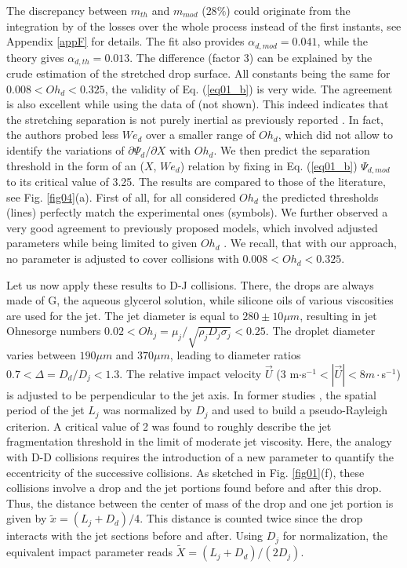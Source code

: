 \documentclass{article}
\begin{document}
 The discrepancy between $m_{th}$ and $m_{mod}$ ($28\%$) could originate from the integration by \cite{ref:Finotello2017} of the losses over the whole process instead of the first instants, see Appendix \ref{appF} for details.  {The fit also provides $\alpha_{d, mod}=0.041$, while the theory gives $\alpha_{d, th}=0.013$. The difference (factor 3) can be explained by the crude estimation of the stretched drop surface.} All constants being the same for $0.008 < Oh_d < 0.325$, the validity of Eq. (\ref{eq01_b}) is very wide. {The agreement is also excellent while using the data of \citet{al-dirawi_2021} (not shown).  This indeed indicates that  the stretching separation is not purely inertial as previously reported \cite{al-dirawi_2021}. In fact, the authors probed less $We_d$ over a smaller range of $Oh_d$, which did not allow to identify the variations of $  \partial \Psi_d/ \partial X$ with $Oh_d$}. We then predict the separation threshold in the form of an ($X$, $We_d$) relation by fixing in Eq. (\ref{eq01_b}) $\Psi_{d, mod}$ to its critical value of {3.25}. 
 The results are compared to those of the literature, see Fig. \ref{fig04}(a). First of all,   for all considered $Oh_d$ the predicted thresholds (lines) perfectly match the experimental ones (symbols). We further observed a very good agreement to previously proposed models, which involved adjusted parameters while being limited to given $Oh_d$ \citep{ref:Jiang1992, ref:Ashgriz1990, ref:Finotello2017, ref:Gotaas2007}. We recall, that with our approach, no parameter is adjusted to cover collisions with $0.008<Oh_d<0.325$.
 
 
 Let us now apply these results to D-J collisions.  There, the drops are always made of G, the aqueous glycerol solution, while silicone oils of various viscosities are used for the jet.  The jet diameter is equal to $280\pm10\mu m$, resulting in jet Ohnesorge numbers $0.02 < Oh_j=\mu_j/\sqrt{\rho_j D_j \sigma_j} < 0.25$. The droplet diameter varies between $190 \mu m$ and $370 \mu m$, leading to diameter ratios $0.7 < \Delta=D_{d}/D_j < 1.3$. The relative impact velocity $\vec{U}$ (3 m$\cdot$s$^{-1} < |\vec{U}| < 8 m\cdot$s$^{-1}$)  is adjusted to be perpendicular to the jet axis. In former studies \citep{ref:Planchette2018, ref:Baumgartner2020, ref:Baumgartner2020_PRF}, the spatial period of the jet $L_j$ was  normalized by $D_j$  and used to build a pseudo-Rayleigh criterion. A critical value of 2 was found to roughly describe the jet fragmentation threshold in the limit of moderate jet viscosity.  Here, the analogy with D-D collisions requires the introduction of a new parameter to quantify the eccentricity of the successive collisions. As sketched in Fig. \ref{fig01}(f), these collisions involve a drop and the jet portions found before and after this drop. Thus, the distance between the center of mass of the drop and one jet portion is given by $\tilde{x}=(L_j+D_d)/4$. This distance is counted twice since the drop interacts with the jet sections before and after. Using $D_j$ for normalization, the equivalent impact parameter reads $\tilde{X}=(L_j+D_d)/(2D_j)$.
 
\end{document}
